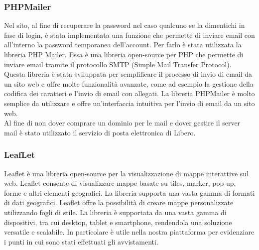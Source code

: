 \documentclass[a4paper,final,12pt]{report}
\begin{document}
\subsubsection{PHPMailer}
Nel sito, al fine di recuperare la password nel caso qualcuno se la dimentichi in fase di login, è stata implementata una funzione che permette di inviare email con all'interno la password temporanea dell'account. Per farlo è stata utilizzata la libreria PHP Mailer. Essa è una libreria open-source per PHP che permette di inviare email tramite il protocollo SMTP (Simple Mail Transfer Protocol). Questa libreria è stata sviluppata per semplificare il processo di invio di email da un sito web e offre molte funzionalità avanzate, come ad esempio la gestione della codifica dei caratteri e l'invio di email con allegati. La libreria PHPMailer è molto semplice da utilizzare e offre un'interfaccia intuitiva per l'invio di email da un sito web.\\
Al fine di non dover comprare un dominio per le mail e dover gestire il server mail è stato utilizzato il servizio di posta elettronica di Libero.

\subsubsection{LeafLet}
Leaflet è una libreria open-source per la visualizzazione di mappe interattive sul web. Leaflet consente di visualizzare mappe basate su tiles, marker, pop-up, forme e altri elementi geografici. La libreria supporta una vasta gamma di formati di dati geografici. Leaflet offre la possibilità di creare mappe personalizzate utilizzando fogli di stile. La libreria è supportata da una vasta gamma di dispositivi, tra cui desktop, tablet e smartphone, rendendola una soluzione versatile e scalabile. In particolare è utile nella nostra piattaforma per evidenziare i punti in cui sono stati effettuati gli avvistamenti.
\end{document}
